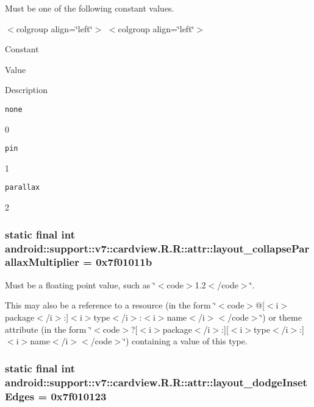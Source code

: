 Must be one of the following constant values. \begin{TabularC}{0}
\hline
\end{TabularC}
$<$colgroup align=\char`\"{}left\char`\"{}$>$ $<$colgroup align=\char`\"{}left\char`\"{}$>$ 

Constant

Value

Description 

{\tt none}

0

{\tt pin}

1

{\tt parallax}

2\hypertarget{classandroid_1_1support_1_1v7_1_1cardview_1_1_r_1_1attr_aeb31de49bf707ec199d40807fd34ca8}{
\subsubsection[{layout\_\-collapseParallaxMultiplier}]{\setlength{\rightskip}{0pt plus 5cm}static final int android::support::v7::cardview.R.R::attr::layout\_\-collapseParallaxMultiplier = 0x7f01011b}}
\label{classandroid_1_1support_1_1v7_1_1cardview_1_1_r_1_1attr_aeb31de49bf707ec199d40807fd34ca8}


Must be a floating point value, such as \char`\"{}$<$code$>$1.2$<$/code$>$\char`\"{}. 

This may also be a reference to a resource (in the form \char`\"{}$<$code$>$@\mbox{[}$<$i$>$package$<$/i$>$:\mbox{]}$<$i$>$type$<$/i$>$:$<$i$>$name$<$/i$>$$<$/code$>$\char`\"{}) or theme attribute (in the form \char`\"{}$<$code$>$?\mbox{[}$<$i$>$package$<$/i$>$:\mbox{]}\mbox{[}$<$i$>$type$<$/i$>$:\mbox{]}$<$i$>$name$<$/i$>$$<$/code$>$\char`\"{}) containing a value of this type. \hypertarget{classandroid_1_1support_1_1v7_1_1cardview_1_1_r_1_1attr_9bd5fb363b99c8c116c99908b401d409}{
\subsubsection[{layout\_\-dodgeInsetEdges}]{\setlength{\rightskip}{0pt plus 5cm}static final int android::support::v7::cardview.R.R::attr::layout\_\-dodgeInsetEdges = 0x7f010123}}
\label{classandroid_1_1support_1_1v7_1_1cardview_1_1_r_1_1attr_9bd5fb363b99c8c116c99908b401d409}


